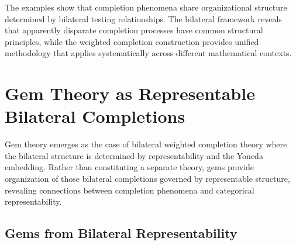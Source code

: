 \documentclass[11pt]{article}
\theoremstyle{plain}
\theoremstyle{definition}
\theoremstyle{remark}
\begin{document}
The examples show that completion phenomena share organizational structure determined by bilateral testing relationships. The bilateral framework reveals that apparently disparate completion processes have common structural principles, while the weighted completion construction provides unified methodology that applies systematically across different mathematical contexts.

\section{Gem Theory as Representable Bilateral Completions}

Gem theory emerges as the case of bilateral weighted completion theory where the bilateral structure is determined by representability and the Yoneda embedding. Rather than constituting a separate theory, gems provide organization of those bilateral completions governed by representable structure, revealing connections between completion phenomena and categorical representability.

\subsection{Gems from Bilateral Representability}
\end{document}
